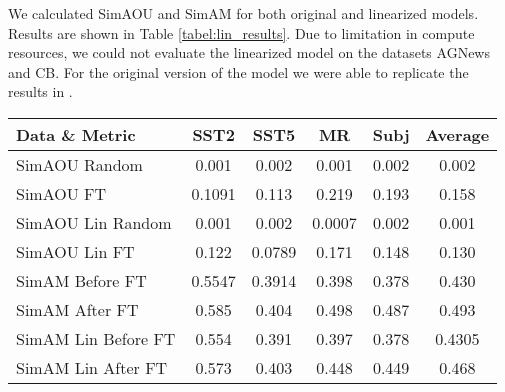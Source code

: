 We calculated SimAOU and SimAM for both original and linearized models. Results are shown in Table \ref{tabel:lin_results}.
Due to limitation in compute resources, we could not evaluate the linearized model on the datasets AGNews and CB. For the original version of the model we were able to replicate the results in \cite{dai2023gpt}. 
\begin{table*}[t]
    \centering
    \caption{SimAOU and SimAM on four datasets, comparing similarity between random and finetune for both original model and liniarization of the model.}
    \label{tabel:lin_results}
    \begin{tabular}{|l|cccc|c|}
    \hline
    Data \& Metric & SST2 & SST5 & MR & Subj & Average \\ \hline
    SimAOU Random & 0.001 & 0.002 & 0.001 & 0.002 & 0.002\\ 
    SimAOU FT & 0.1091 & 0.113& 0.219& 0.193 & 0.158 \\ 
    SimAOU Lin Random & 0.001 & 0.002 & 0.0007 & 0.002	& 0.001 \\
    SimAOU Lin FT & 0.122 & 0.0789 &	0.171	& 0.148	& 0.130 \\ \hline
    SimAM Before FT & 0.5547 & 0.3914 & 0.398 & 0.378 & 0.430 \\
    SimAM After FT & 0.585 & 0.404 & 0.498 & 0.487 & 0.493 \\
    SimAM Lin Before FT & 0.554 & 0.391 &	0.397 & 0.378 & 0.4305 \\
    SimAM Lin After FT & 0.573 & 0.403 & 0.448 & 0.449 & 0.468 \\ \hline
    \end{tabular}
    \end{table*}
    